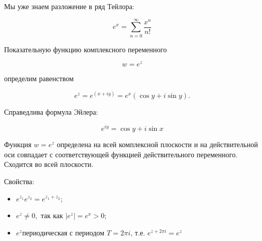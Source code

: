 
\begin{theorem}  \thmslashn
    
    Мы уже знаем разложение в ряд Тейлора:
    
    \[e^{x}=\sum_{n=0}^{\infty} \frac{x^{n}}{n!}\]
    
	Показательную функцию комплексного переменного 
	
	\[w = e^{z}\]
	
    определим равенством
    
    \[e^{z}=e^{(x+iy)}=e^{x}(\cos{y} + i\sin{y}).\]
    
    Справедлива формула Эйлера:
    
    \[e^{iy}=\cos{y} + i\sin{x}\]
    
    Функция $w = e^{z}$ определена на всей комплексной плоскости и на действительной оси совпадает с соответствующей функцией действительного переменного. Сходится во всей плоскости.
    
    Свойства:
    
    \begin{itemize}
        \item
        
            $e^{z_{1}}e^{z_{2}}=e^{z_{1}+z_{2}}$;
            
        \item
        
            $e^{z}\neq0, \text{ так как } |e^{z}| =  e^{x} > 0$;
            
        \item
            
            $e^{z} \text{периодическая с периодом } T = 2\pi i \text{, т.е. } e^{z+2\pi i} = e^{z}$
            
    \end{itemize}
    
\end{theorem}

